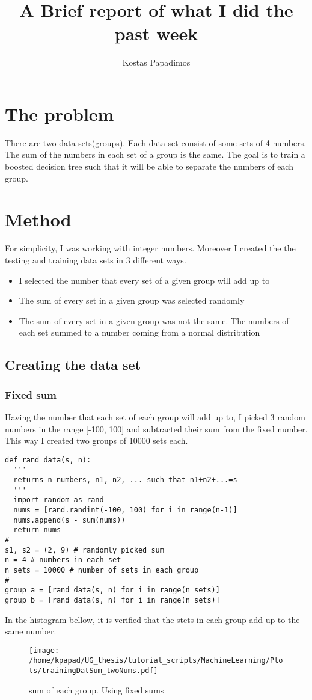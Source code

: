 \documentclass[11pt,a4paper]{article}
\author{Kostas Papadimos}
\date{}
\title{A Brief report of what I did the past week}
\begin{document}
\maketitle
\tableofcontents

\section{The problem}
\label{sec:org73da5ce}
There are two data sets(groups). Each data set consist of some  sets of 4 numbers. The sum of the numbers in each set of a group is the same.
The goal is to train a boosted decision tree such that it will be able to separate the numbers of each group.  
\section{Method}
\label{sec:orga5dafd6}
For simplicity, I was working with integer numbers. Moreover I created the the testing and training data sets in 3 different ways.
\begin{itemize}
\item I selected the number that every set of a given group will add up to
\item The sum of every set in a given group was selected randomly
\item The sum of every set in a given group was not the same. The numbers of each set summed to a number coming from a normal distribution
\end{itemize}
\subsection{Creating the data set}
\label{sec:org6702f83}
\subsubsection{Fixed sum}
\label{sec:orgef63043}
Having the number that each set of each group will add up to, I picked 3 random numbers in the range [-100, 100] and subtracted their sum from the fixed number. This way I created two groups of 10000 sets each.
\begin{verbatim}
def rand_data(s, n):
  '''
  returns n numbers, n1, n2, ... such that n1+n2+...=s
  '''
  import random as rand
  nums = [rand.randint(-100, 100) for i in range(n-1)]
  nums.append(s - sum(nums))
  return nums
#
s1, s2 = (2, 9) # randomly picked sum
n = 4 # numbers in each set
n_sets = 10000 # number of sets in each group
#
group_a = [rand_data(s, n) for i in range(n_sets)]
group_b = [rand_data(s, n) for i in range(n_sets)]
\end{verbatim}
In the histogram bellow, it is verified that the stets in each group add up to the same number.
\begin{figure}[htbp]
\centering
\texttt{[image: /home/kpapad/UG\_thesis/tutorial\_scripts/MachineLearning/Plots/trainingDatSum\_twoNums.pdf]}
\caption{\label{fig:org09df792}sum of each group. Using fixed sums}
\end{figure}
\end{document}
